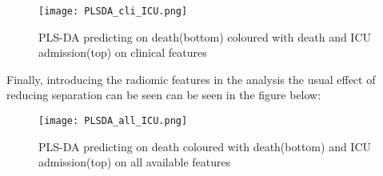 \begin{figure}[H]
  		\texttt{[image: PLSDA\_cli\_ICU.png]}
          \caption{PLS-DA predicting on death(bottom) coloured with death and ICU admission(top) on clinical features\label{fig:PLSDA-ICU}}
\end{figure}

Finally, introducing the radiomic features in the analysis the usual effect of reducing separation can be seen can be seen in the figure below:

\begin{figure}[H]
  		\texttt{[image: PLSDA\_all\_ICU.png]}
          \caption{PLS-DA predicting on death coloured with death(bottom) and ICU admission(top) on all available features\label{fig:PLSDA-ICU-all}}
\end{figure}
 